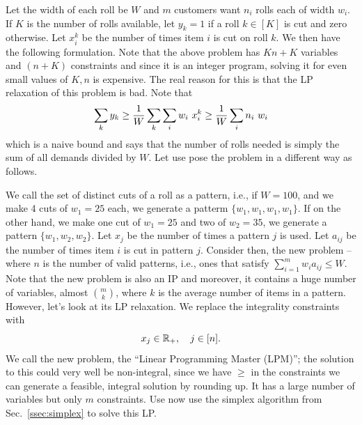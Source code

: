 \documentclass[letterpaper, 10pt, twocolumn, reqno]{amsart}
\begin{document}
Let the width of each roll be $W$ and $m$ customers want $n_i$ rolls each of width $w_i$. If $K$ is the number of rolls available, let $y_k = 1$ if a roll $k \in [K]$ is cut and zero otherwise. Let $x_i^k$ be the number of times item $i$ is cut on roll $k$. We then have the following formulation.
Note that the above problem has $Kn + K$ variables and $(n+K)$ constraints and since it is an integer program, solving it for even small values of $K, n$ is expensive. The real reason for this is that the LP relaxation of this problem is bad. Note that
$$
\sum_k y_k \geq \frac{1}{W} \sum_k \sum_i w_i\ x_i^k \geq \frac{1}{W} \sum_i n_i\ w_i
$$
which is a naive bound and says that the number of rolls needed is simply the sum of all demands divided by $W$. Let use pose the problem in a different way as follows.

We call the set of distinct cuts of a roll as a pattern, i.e., if $W=100$, and we make 4 cuts of $w_1 = 25$ each, we generate a patterm $\{ w_1, w_1, w_1, w_1 \}$. If on the other hand, we make one cut of $w_1 =25$ and two of $w_2 = 35$, we generate a pattern $\{ w_1, w_2, w_2 \}$. Let $x_j$ be the number of times a pattern $j$ is used. Let $a_{ij}$ be the number of times item $i$ is cut in pattern $j$. Consider then, the new problem --
where $n$ is the number of valid patterns, i.e., ones that satisfy $\sum_{i=1}^m w_i a_{ij} \leq W$. Note that the new problem is also an IP and moreover, it contains a huge number of variables, almost $m \choose k$, where $k$ is the average number of items in a pattern. However, let's look at its LP relaxation. We replace the integrality constraints with
$$
x_j \in \mathbb{R}_+,\quad j \in [n].
$$
We call the new problem, the ``Linear Programming Master (LPM)''; the solution to this could very well be non-integral, since we have $\geq$ in the constraints we can generate a feasible, integral solution by rounding up. It has a large number of variables but only $m$ constraints. Use now use the simplex algorithm from Sec.~\ref{ssec:simplex} to solve this LP.
\end{document}
